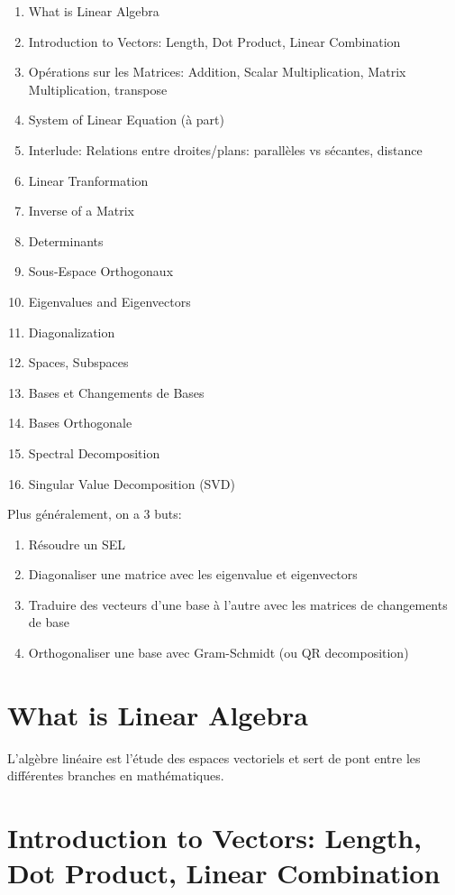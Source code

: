\documentclass{article}
\begin{document}
\begin{enumerate}
    \item What is Linear Algebra
    \item Introduction to Vectors: Length, Dot Product, Linear Combination
    \item Opérations sur les Matrices: Addition, Scalar Multiplication,
	Matrix Multiplication, transpose
    \item System of Linear Equation (à part)
    \item Interlude: Relations entre droites/plans: parallèles vs sécantes,
	distance
    \item Linear Tranformation
    \item Inverse of a Matrix
    \item Determinants
    \item Sous-Espace Orthogonaux
    \item Eigenvalues and Eigenvectors
    \item Diagonalization
    \item Spaces, Subspaces
    \item Bases et Changements de Bases
    \item Bases Orthogonale
    \item Spectral Decomposition
    \item Singular Value Decomposition (SVD)
\end{enumerate}

Plus généralement, on a 3 buts:
\begin{enumerate}
    \item Résoudre un SEL
    \item Diagonaliser une matrice avec les eigenvalue et eigenvectors
    \item Traduire des vecteurs d'une base à l'autre avec les matrices de
	changements de base
    \item Orthogonaliser une base avec Gram-Schmidt (ou QR decomposition)
\end{enumerate}


\section{What is Linear Algebra}

L'algèbre linéaire est l'étude des espaces vectoriels et sert de pont entre les
différentes branches en mathématiques.

\section{Introduction to Vectors: Length, Dot Product, Linear Combination}
\end{document}
